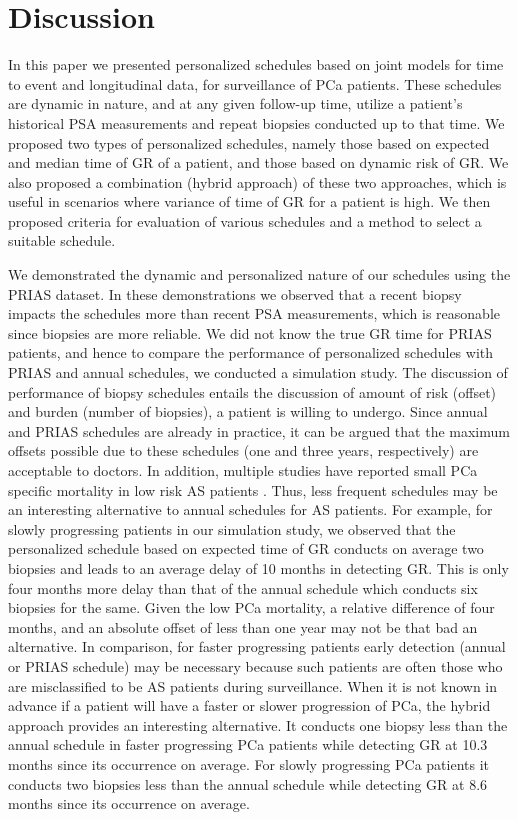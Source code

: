 
\section{Discussion}
\label{sec: discussion}
In this paper we presented personalized schedules based on joint models for time to event and longitudinal data, for surveillance of PCa patients. These schedules are dynamic in nature, and at any given follow-up time, utilize a patient's historical PSA measurements and repeat biopsies conducted up to that time. We proposed two types of personalized schedules, namely those based on expected and median time of GR of a patient, and those based on dynamic risk of GR. We also proposed a combination (hybrid approach) of these two approaches, which is useful in scenarios where variance of time of GR for a patient is high. We then proposed criteria for evaluation of various schedules and a method to select a suitable schedule.

We demonstrated the dynamic and personalized nature of our schedules using the PRIAS dataset. In these demonstrations we observed that a recent biopsy impacts the schedules more than recent PSA measurements, which is reasonable since biopsies are more reliable. We did not know the true GR time for PRIAS patients, and hence to compare the performance of personalized schedules with PRIAS and annual schedules, we conducted a simulation study. The discussion of performance of biopsy schedules entails the discussion of amount of risk (offset) and burden (number of biopsies), a patient is willing to undergo. Since annual and PRIAS schedules are already in practice, it can be argued that the maximum offsets possible due to these schedules (one and three years, respectively) are acceptable to doctors. In addition, multiple studies have reported small PCa specific mortality in low risk AS patients \citep{loeb2016immediate,tosoian2011active,klotz2009clinical}. Thus, less frequent schedules may be an interesting alternative to annual schedules for AS patients. For example, for slowly progressing patients in our simulation study, we observed that the personalized schedule based on expected time of GR conducts on average two biopsies and leads to an average delay of 10 months in detecting GR. This is only four months more delay than that of the annual schedule which conducts six biopsies for the same. Given the low PCa mortality, a relative difference of four months, and an absolute offset of less than one year may not be that bad an alternative. In comparison, for faster progressing patients early detection (annual or PRIAS schedule) may be necessary because such patients are often those who are misclassified to be AS patients during surveillance. When it is not known in advance if a patient will have a faster or slower progression of PCa, the hybrid approach provides an interesting alternative. It conducts one biopsy less than the annual schedule in faster progressing PCa patients while detecting GR at 10.3 months since its occurrence on average. For slowly progressing PCa patients it conducts two biopsies less than the annual schedule while detecting GR at 8.6 months since its occurrence on average. 

